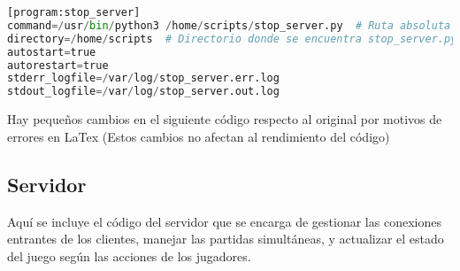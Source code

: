 \documentclass{article}
\begin{document}
\begin{lstlisting}[language=Python, caption={Código Python}, label={lst:python_code}]
[program:stop_server]
command=/usr/bin/python3 /home/scripts/stop_server.py  # Ruta absoluta al script stop_server.py
directory=/home/scripts  # Directorio donde se encuentra stop_server.py
autostart=true
autorestart=true
stderr_logfile=/var/log/stop_server.err.log
stdout_logfile=/var/log/stop_server.out.log
\end{lstlisting}

\newpage

Hay pequeños cambios en el siguiente código respecto al original por motivos de errores en LaTex (Estos cambios no afectan al rendimiento del código)

\subsection{Servidor}
Aquí se incluye el código del servidor que se encarga de gestionar las conexiones entrantes de los clientes, manejar las partidas simultáneas, y actualizar el estado del juego 
según las acciones de los jugadores.
\end{document}
